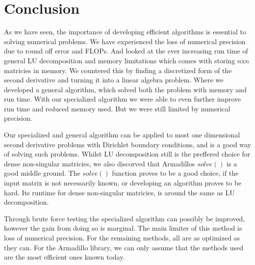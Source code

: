 \documentclass[10pt, a4paper]{amsart}
\begin{document}
\section{Conclusion}
As we have seen, the importance of developing efficient algorithms is essential to solving numerical problems. We have experienced the loss of numerical precision due to round off error and FLOPs. And looked at the ever increasing run time of general LU decomposition and memory limitations which comes with storing $n$x$n$ matricies in memory. 
We countered this by finding a discretized form of the second derivative and turning it into a linear algebra problem. Where we developed a general algorithm, which solved both the problem with memory and run time. With our specialized algorithm we were able to even further improve run time and reduced memory used. But we were still limited by numerical precision. 

Our specialized and general algorithm can be applied to most one dimensional second derivative problems with Dirichlet boundary conditions, and is a good way of solving such problems. Whilst LU decomposition still is the preffered choice for dense non-singular matricies, we also discorved that Armadillos $solve()$ is a good middle ground. The $solve()$ function proves to be a good choice, if the input matrix is not necessarily known, or developing an algorithm proves to be hard. Its runtime for dense non-singular matricies, is around the same as LU decomposition. 

Through brute force testing the specialized algorithm can possibly be improved, however the gain from doing so is marginal. The main limiter of this method is loss of numerical precision. For the remaining methods, all are as optimized as they can\cite{morten}. 
For the Armadillo library, we can only assume that the methods used are the most efficient ones known today. 

\end{document}
